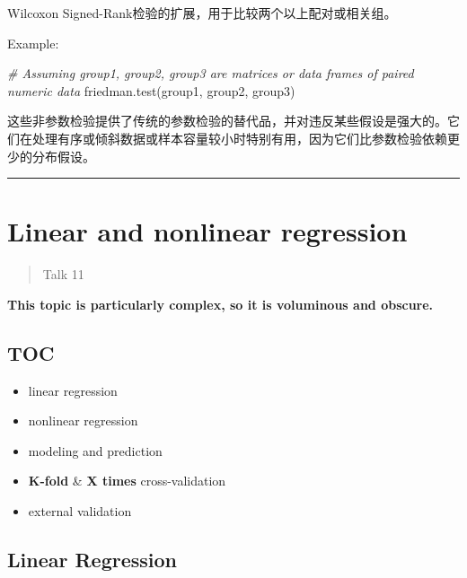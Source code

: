 \documentclass[
]{article}
\newenvironment{Shaded}{}{}
\newcommand{\CommentTok}[1]{\textcolor[rgb]{0.38,0.63,0.69}{\textit{#1}}}
\newcommand{\FunctionTok}[1]{\textcolor[rgb]{0.02,0.16,0.49}{#1}}
\newcommand{\NormalTok}[1]{#1}
\begin{document}
\begin{enumerate}
  Wilcoxon Signed-Rank检验的扩展，用于比较两个以上配对或相关组。

  Example:

\begin{Shaded}
\begin{Highlighting}[]
\CommentTok{\# Assuming \textquotesingle{}group1\textquotesingle{}, \textquotesingle{}group2\textquotesingle{}, \textquotesingle{}group3\textquotesingle{} are matrices or data frames of paired numeric data}
\FunctionTok{friedman.test}\NormalTok{(group1, group2, group3)}
\end{Highlighting}
\end{Shaded}
\end{enumerate}

这些非参数检验提供了传统的参数检验的替代品，并对违反某些假设是强大的。它们在处理有序或倾斜数据或样本容量较小时特别有用，因为它们比参数检验依赖更少的分布假设。

\begin{center}\rule{0.5\linewidth}{0.5pt}\end{center}

\newpage
\hypertarget{linear-and-nonlinear-regression}{%
\section{Linear and nonlinear
regression}\label{linear-and-nonlinear-regression}}

\begin{quote}
Talk 11
\end{quote}

\textbf{This topic is particularly complex, so it is voluminous and
obscure.}

\hypertarget{toc-3}{%
\subsection{TOC}\label{toc-3}}

\begin{itemize}
\item
  linear regression
\item
  nonlinear regression
\item
  modeling and prediction
\item
  \textbf{K-fold} \& \textbf{X times} cross-validation
\item
  external validation
\end{itemize}

\hypertarget{linear-regression-2}{%
\subsection{Linear Regression}\label{linear-regression-2}}
\end{document}

